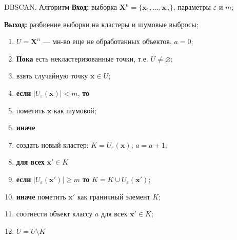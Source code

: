 \documentclass[unicode, notheorems, handout]{beamer}
\begin{document}
\begin{frame}{DBSCAN. Алгоритм}
\textbf{Вход:} выборка $\pmb X^{n} = \{\pmb x_1, \dots, \pmb x_{n}\}$, параметры $\varepsilon$ и $m$;
	
\textbf{Выход:} разбиение выборки на кластеры и шумовые выбросы;
\begin{enumerate}
		\item $U=\pmb X^n$ --- мн-во еще не обработанных объектов, $a=0$; 
		\item \textbf{Пока} есть некластеризованные точки, т.е. $U \neq \varnothing$; 
		\item \quad взять случайную точку $\pmb x \in U$; 
		\item \quad \textbf{если} $|U_\varepsilon (\pmb x)| < m$, \textbf{то} 
		\item \quad \quad пометить $\pmb x$ как шумовой; 
		\item \quad \textbf{иначе} 
		\item \quad \quad создать новый кластер: $K=U_\varepsilon (\pmb x)$; $a = a + 1$; 
		\item \quad \quad \textbf{для всех} $\pmb x' \in K$ 
		\item \quad \quad \quad \textbf{если} $|U_\varepsilon (\pmb x')| \geq m$ \textbf{то} $K=K \cup U_\varepsilon(\pmb x')$; 
		\item \quad \quad \quad \textbf{иначе} пометить $\pmb x'$ как граничный элемент $K$; 
		\item \quad \quad соотнести объект классу $a$ для всех $\pmb x' \in K$; 
		\item \quad \quad $U=U \setminus K$ 
\end{enumerate}

\end{frame}
\end{document}
